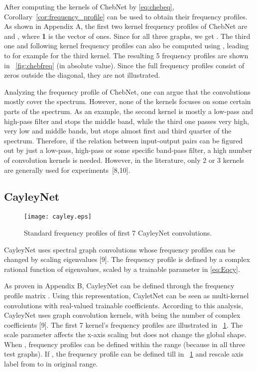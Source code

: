 \documentclass{article}
\begin{document}
After computing the kernels of ChebNet by \eqref{eq:chebeq}, Corollary~\ref{cor:frequency_profile} can be used to obtain their frequency profiles. As shown in Appendix A, the first two kernel frequency profiles of ChebNet are  and , where {\bf1} is the vector of ones. Since  for all three graphs, we get . The third one and following kernel frequency profiles can also be computed using , leading to  for example for the third kernel. 
The resulting 5 frequency profiles are shown in \figurename~\ref{fig:chebfreq} (in absolute value).  
Since the full frequency profiles consist of zeros outside the diagonal, they are not illustrated.

Analyzing the frequency profile of ChebNet, one can argue that the convolutions mostly cover the spectrum. However, none of the kernels focuses on some certain parts of the spectrum. As an example, the second kernel is mostly a low-pass and high-pass filter and stops the middle band, while the third one passes very high, very low and middle bands, but stops almost first and third quarter of the spectrum. Therefore, if the relation between input-output pairs can be figured out by just a low-pass, high-pass or some specific band-pass filter, a high number of convolution kernels is needed. However, in the literature, only 2 or 3 kernels are generally used for experiments~[8,10]. 

\subsection*{CayleyNet}

\begin{figure}[!t]
\centering
\texttt{[image: cayley.eps]}
\caption{Standard frequency profiles of first 7 CayleyNet convolutions. 
}
\label{fig:cayleyfreq}
\end{figure}
CayleyNet uses spectral graph convolutions whose frequency profiles can be changed by scaling eigenvalues [9]. The frequency profile is defined by a complex rational function of eigenvalues, scaled by a trainable parameter  in \eqref{eq:Eqcy}. 

As proven in Appendix B, CayleyNet can be defined through the frequency profile matrix . Using this representation, CayletNet can be seen as multi-kernel convolutions with real-valued trainable coefficients. According to this analysis, CayleyNet uses  graph convolution kernels, with  being the number of complex coefficients [9]. The first 7 kernel's frequency profiles are illustrated in \figurename~\ref{fig:cayleyfreq}. The scale parameter  affects the x-axis scaling but does not change the global shape. When , frequency profiles can be defined within the range  (because  in all three test graphs). If , the frequency profile can be defined till  in \figurename~\ref{fig:cayleyfreq} and rescale axis label from  to  in original range.
\end{document}

